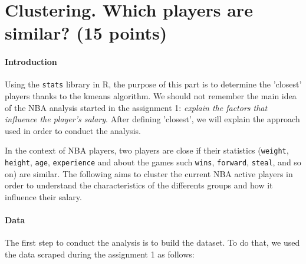 \section*{Clustering. Which players are similar? (15 points)}
\label{subsec:3Q1}

\paragraph{Introduction}Using the \texttt{stats} library in R, the purpose of this part is to determine the 'closest' players thanks to the kmeans algorithm. We should not remember the main idea of the NBA analysis started in the assignment 1: \textit{explain the factors that influence the player's salary}. After defining 'closest', we will explain the approach used in order to conduct the analysis.

In the context of NBA players, two players are close if their statistics (\texttt{weight}, \texttt{height}, \texttt{age}, \texttt{experience} and about the games such \texttt{wins}, \texttt{forward}, \texttt{steal}, and so on) are similar. The following aims to cluster the current NBA active players in order to understand the characteristics of the differents groups and how it influence their salary.

\paragraph{Data}The first step to conduct the analysis is to build the dataset. To do that, we used the data scraped during the assignment 1 as follows:

